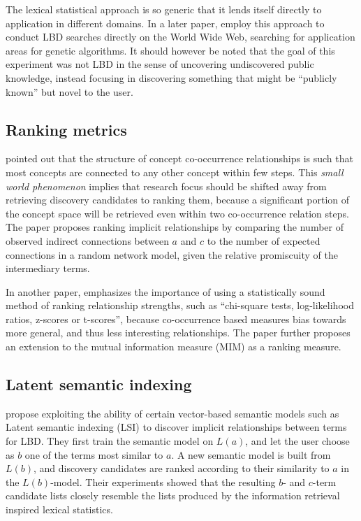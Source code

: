 The lexical statistical approach is so generic that it lends itself directly to application in different domains. In a later paper, \citet{gor01} employ this approach to conduct LBD searches directly on the World Wide Web, searching for application areas for genetic algorithms. It should however be noted that the goal of this experiment was not LBD in the sense of uncovering undiscovered public knowledge, instead focusing in discovering something that might be ``publicly known'' but novel to the user.

\subsection{Ranking metrics}
\citet{wre04a} pointed out that the structure of concept co-occurrence relationships is such that most concepts are connected to any other concept within few steps. This \emph{small world phenomenon} implies that research focus should be shifted away from retrieving discovery candidates to ranking them, because a significant portion of the concept space will be retrieved even within two co-occurrence relation steps. The paper proposes ranking implicit relationships by comparing the number of observed indirect connections between $a$ and $c$ to the number of expected connections in a random network model, given the relative promiscuity of the intermediary terms. 

In another paper, \citet{wre04b} emphasizes the importance of using a statistically sound method of ranking relationship strengths, such as ``chi-square tests, log-likelihood ratios, z-scores or t-scores'', because co-occurrence based measures bias towards more general, and thus less interesting relationships. The paper further proposes an extension to the mutual information measure (MIM) as a ranking measure.

\subsection{Latent semantic indexing}
\citet{gor98} propose exploiting the ability of certain vector-based semantic models such as Latent semantic indexing (LSI) to discover implicit relationships between terms for LBD. They first train the semantic model on $L(a)$, and let the user choose as $b$ one of the terms most similar to $a$. A new semantic model is built from $L(b)$, and discovery candidates are ranked according to their similarity to $a$ in the $L(b)$-model. Their experiments showed that the resulting $b$- and $c$-term candidate lists closely resemble the lists produced by the information retrieval inspired lexical statistics. 

